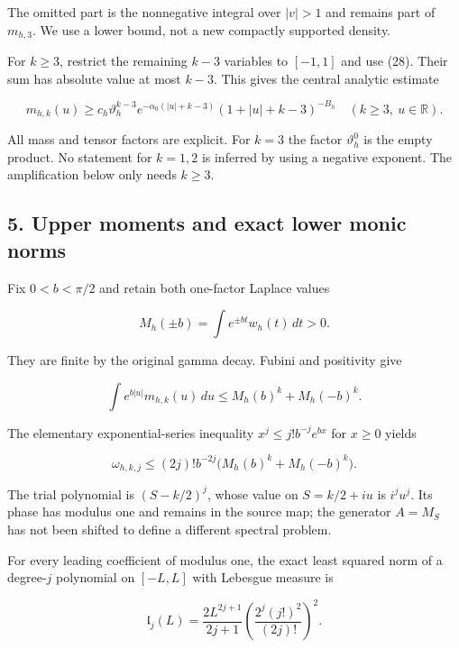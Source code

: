 \documentclass[11pt,a4paper]{article}
\begin{document}
The omitted part is the nonnegative integral over \(|v|>1\) and remains part of \(m_{h,3}\). We use a lower bound, not a new compactly supported density.

For \(k\ge3\), restrict the remaining \(k-3\) variables to \([-1,1]\) and use (28). Their sum has absolute value at most \(k-3\). This gives the central analytic estimate

\[
 \boxed{
 m_{h,k}(u)\ge
 c_h\vartheta_h^{k-3}
 e^{-\alpha_0(|u|+k-3)}
 (1+|u|+k-3)^{-B_h}
 \quad(k\ge3,\ u\in\mathbb R).}                                       \tag{29}
\]

All mass and tensor factors are explicit. For \(k=3\) the factor \(\vartheta_h^0\) is the empty product. No statement for \(k=1,2\) is inferred by using a negative exponent. The amplification below only needs \(k\ge3\).

\subsection{5. Upper moments and exact lower monic norms}\label{zlm:endpoint-arithmetic_original--upper-moments-and-exact-lower-monic-norms}

Fix \(0<b<\pi/2\) and retain both one-factor Laplace values

\[
 M_h(\pm b)=\int e^{\pm bt}w_h(t)\,dt>0.                               \tag{30}
\]

They are finite by the original gamma decay. Fubini and positivity give

\[
 \int e^{b|u|}m_{h,k}(u)\,du
 \le M_h(b)^k+M_h(-b)^k.                                                \tag{31}
\]

The elementary exponential-series inequality \(x^j\le j!b^{-j}e^{bx}\) for \(x\ge0\) yields

\[
 \omega_{h,k,j}
 \le (2j)!b^{-2j}\bigl(M_h(b)^k+M_h(-b)^k\bigr).                       \tag{32}
\]

The trial polynomial is \((S-k/2)^j\), whose value on \(S=k/2+iu\) is \(i^ju^j\). Its phase has modulus one and remains in the source map; the generator \(A=M_S\) has not been shifted to define a different spectral problem.

For every leading coefficient of modulus one, the exact least squared norm of a degree-\(j\) polynomial on \([-L,L]\) with Lebesgue measure is

\[
 \mathfrak l_j(L)=
 \frac{2L^{2j+1}}{2j+1}
       \left(\frac{2^j(j!)^2}{(2j)!}\right)^2.                           \tag{33}
\]
\end{document}
